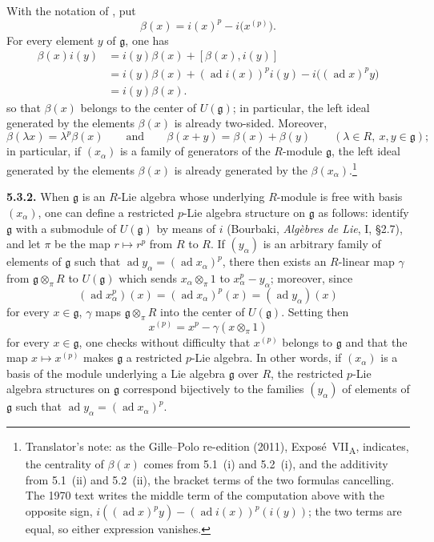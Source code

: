 With the notation of , put
\[
  \beta(x)=i(x)^p-i\bigl(x^{(p)}\bigr).
\]
For every element \(y\) of \(\mathfrak g\), one has
\[
\begin{aligned}
  \beta(x)i(y)
  &=
  i(y)\beta(x)+[\beta(x),i(y)]\\
  &=
  i(y)\beta(x)
  +(\operatorname{ad}i(x))^p i(y)
  -i\bigl((\operatorname{ad}x)^p y\bigr)\\
  &=
  i(y)\beta(x).
\end{aligned}
\]
so that \(\beta(x)\) belongs to the center of \(U(\mathfrak g)\);
in particular, the left ideal generated by the elements
\(\beta(x)\) is already two-sided. Moreover,
\[
  \beta(\lambda x)=\lambda^p\beta(x)
  \qquad\text{and}\qquad
  \beta(x+y)=\beta(x)+\beta(y)
  \qquad(\lambda\in R,\ x,y\in\mathfrak g);
\]
in particular, if \((x_\alpha)\) is a family of generators of the
\(R\)-module \(\mathfrak g\), the left ideal generated by the elements
\(\beta(x)\) is already generated by the \(\beta(x_\alpha)\).\footnote{Translator's
note: as the Gille--Polo re-edition (2011),
Expos\'e~VII\textsubscript{A}, indicates, the centrality of \(\beta(x)\)
comes from 5.1~(i) and 5.2~(i), and the additivity from 5.1~(ii) and
5.2~(ii), the bracket terms of the two formulas cancelling. The 1970 text
writes the middle term of the computation above with the opposite sign,
\(i((\operatorname{ad}x)^py)-(\operatorname{ad}i(x))^p(i(y))\); the
two terms are equal, so either expression vanishes.}

\medskip
\noindent\textbf{5.3.2.}
\label{sga3:VIIA:5.3.2}
When \(\mathfrak g\) is an \(R\)-Lie algebra whose underlying
\(R\)-module is free with basis \((x_\alpha)\), one can define a
restricted \(p\)-Lie algebra structure on \(\mathfrak g\) as follows:
identify \(\mathfrak g\) with a submodule of \(U(\mathfrak g)\) by means
of \(i\) (Bourbaki, \emph{Alg\`ebres de Lie}, I, \S2.7), and let \(\pi\)
be the map \(r\mapsto r^p\) from \(R\) to \(R\). If \((y_\alpha)\) is an
arbitrary family of elements of \(\mathfrak g\) such that
\(\operatorname{ad}y_\alpha=(\operatorname{ad}x_\alpha)^p\), there then
exists an \(R\)-linear map \(\gamma\) from \(\mathfrak g\otimes_\pi R\)
to \(U(\mathfrak g)\) which sends \(x_\alpha\otimes_\pi1\) to
\(x_\alpha^p-y_\alpha\); moreover, since
\[
  (\operatorname{ad}x_\alpha^p)(x)
  =
  (\operatorname{ad}x_\alpha)^p(x)
  =
  (\operatorname{ad}y_\alpha)(x)
\]
for every \(x\in\mathfrak g\), \(\gamma\) maps
\(\mathfrak g\otimes_\pi R\) into the center of \(U(\mathfrak g)\).
Setting then
\[
  x^{(p)}
  =
  x^p-\gamma(x\otimes_\pi1)
\]
for every \(x\in\mathfrak g\), one checks without difficulty that
\(x^{(p)}\) belongs to \(\mathfrak g\) and that the map
\(x\mapsto x^{(p)}\) makes \(\mathfrak g\) a restricted \(p\)-Lie
algebra. In other words, if \((x_\alpha)\) is a basis of the module
underlying a Lie algebra \(\mathfrak g\) over \(R\), the restricted
\(p\)-Lie algebra structures on \(\mathfrak g\) correspond bijectively to
the families \((y_\alpha)\) of elements of \(\mathfrak g\) such that
\(\operatorname{ad}y_\alpha=(\operatorname{ad}x_\alpha)^p\).

